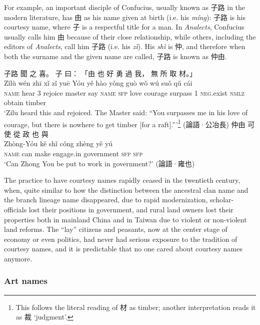 \documentclass[UTF8, a4paper, oneside, scheme=plain, 12pt]{ctexrep}
\newcommand{\form}[1]{\emph{#1}}
\newcommand{\translate}[1]{`#1'}
\newcommand*{\category}[1]{\textsc{#1}}
\begin{document}
For example, an important disciple of Confucius, usually known as 子路 in the modern literature,
has 由 as his name given at birth (i.e. his \form{míng}):
子路 is his courtesy name, where 子 is a respectful title for a man.
In \form{Analects}, Confucius usually calls him 由 because of their close relationship,
while others, including the editors of \form{Analects}, call him 子路 (i.e. his \form{zì}).
His \form{shì} is 仲, and therefore when both the surname and the given name are called,
子路 is known as 仲由.

\begin{exe}
    \ex
    \glll 子路 聞 之 喜。 子 曰： 「由 也 好 勇 過 我， 無 所 取 材。」 \\
    Zǐlù wén zhī xǐ zǐ yuē Yóu yě hào yǒng guò wǒ wú suǒ qǔ cái \\
    \category{name} hear 3 rejoice master say \category{name} \category{sfp} love courage surpass 1 \category{neg}.exist \category{nmlz} obtain timber \\
    \glt\translate{Zilu heard this and rejoiced. The Master said: ``You surpasses me in his love of courage, but there is nowhere to get timber [for a raft].''}\footnote{This follows the literal reading of 材 as timber; another interpretation reads it as 裁 \translate{judgment}.} \hfill (論語·公冶長)
    \ex
    \glll 仲由 可 使 從 政 也 與 \\
    Zhòng-Yóu kě shǐ cóng zhèng yě yú \\
    \category{name} can make engage.in government \category{sfp} \category{sfp} \\
    \glt\translate{Can Zhong You be put to work in government?} \hfill (論語·雍也)
\end{exe}

The practice to have courtesy names rapidly ceased in the twentieth century,
when, quite similar to how the distinction between the ancestral clan name and the branch lineage name disappeared,
due to rapid modernization, scholar-officials lost their positions in government,
and rural land owners lost their properties both in mainland China and in Taiwan
due to violent or non-violent land reforms.
The ``lay'' citizens and peasants, now at the center stage of economy or even politics,
had never had serious exposure to the tradition of courtesy names,
and it is predictable that no one cared about courtesy names anymore.

\subsubsection{Art names}
\end{document}
